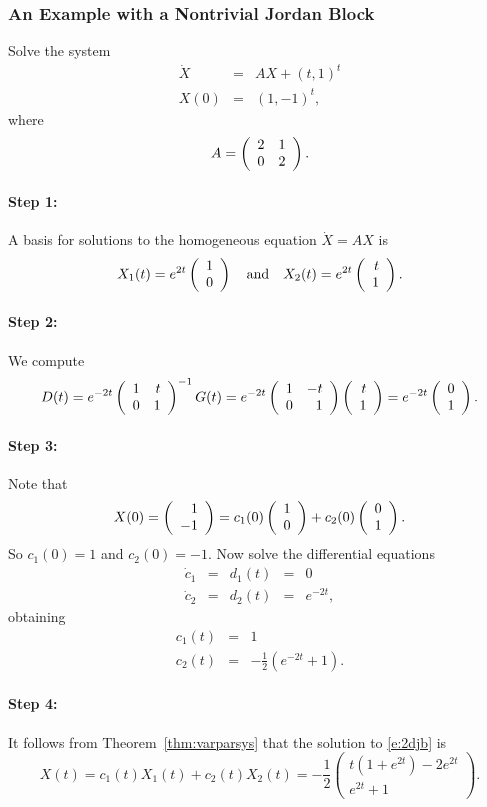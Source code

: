 \documentclass{ximera}
\begin{document}
\subsubsection*{An Example with a Nontrivial Jordan Block}

Solve the system
\begin{equation}  \label{e:2djb}
\begin{array}{rcl}
\dot{X} & = & A X + (t,1)^t \\
X(0) & = & (1,-1)^t,
\end{array}
\end{equation}
where 
\[
A = \left(\begin{array}{rr} 2 & 1\\ 0 &2\end{array}\right).
\]

\paragraph{Step 1:}  A basis for solutions to the homogeneous equation 
$\dot{X}=AX$ is
\[
X_1(t) = e^{2t}\left(\begin{array}{r} 1 \\ 0\end{array}\right) \quad\mbox{and}\quad X_2(t) = e^{2t}\left(\begin{array}{r} t \\ 1\end{array}\right).
\]

\paragraph{Step 2:}  We compute
\[
D(t) =  e^{-2t}\left(\begin{array}{rr} 1 & t\\ 0 &1\end{array}\right)^{-1} G(t) = 
e^{-2t}\left(\begin{array}{rr} 1 & -t\\ 0 &1\end{array}\right)\left(\begin{array}{r} t \\ 1\end{array}\right) = e^{-2t}\left(\begin{array}{r} 0 \\ 1\end{array}\right).
\]

\paragraph{Step 3:}  Note that 
\[
X(0) = \left(\begin{array}{r} 1 \\ -1\end{array}\right) = c_1(0)\left(\begin{array}{r} 1 \\ 0\end{array}\right) + c_2(0)\left(\begin{array}{r} 0 \\ 1\end{array}\right).
\]
So $c_1(0)=1$ and $c_2(0)=-1$.  Now solve the differential equations
\[
\begin{array}{rclcl}
\dot{c}_1 & = & d_1(t) & = & 0 \\
\dot{c}_2 & = & d_2(t) & = & e^{-2t},
\end{array}
\]
obtaining
\begin{eqnarray*}
c_1(t) & = & 1 \\
c_2(t) & = & -\frac{1}{2}(e^{-2t}+1).
\end{eqnarray*}

\paragraph{Step 4:}  It follows from Theorem~\ref{thm:varparsys} that the 
solution to \eqref{e:2djb} is
\[
X(t) = c_1(t)X_1(t) + c_2(t)X_2(t) = -\frac{1}{2}\left(\begin{array}{c}
t(1+e^{2t})-2e^{2t} \\ e^{2t}+1 \end{array}\right).
\]
 


\EXER

\end{document}
